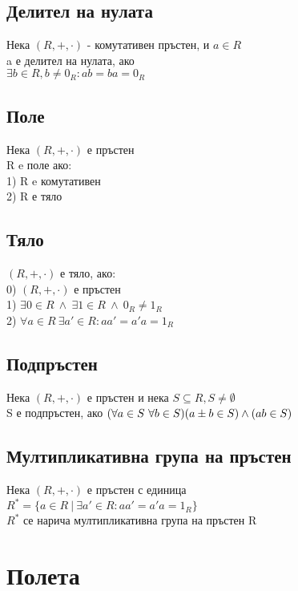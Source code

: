 \documentclass[12pt]{article}
\begin{document}
\subsection{Делител на нулата}
Нека $(R, +, \cdot)$ - комутативен пръстен, и $a \in R$\\
a е делител на нулата, ако \\
$\exists b \in R, b \neq 0_R : ab = ba = 0_R$

\subsection{Поле}
Нека $(R, +, \cdot)$ е пръстен \\
R e поле ако: \\
1) R e комутативен \\
2) R е тяло 

\subsection{Тяло}
$(R, +, \cdot)$ е тяло, ако: \\
0) $(R, +, \cdot)$ е пръстен \\
1) $\exists 0 \in R \ \land \ \exists 1 \in R \ \land \ 0_R \neq 1_R$ \\
2) $\forall a \in R \ \exists a' \in R : aa' = a'a = 1_R$

\subsection{Подпръстен}
Нека $(R, +, \cdot)$ е пръстен
и нека $S \subseteq R, S \neq \emptyset$ \\
S е подпръстен, ако
$(\forall a \in S \ \forall b \in S) \\ (a \pm b \in S) \land (ab \in S)$

\subsection{Мултипликативна група на пръстен}
Нека $(R, +, \cdot)$ е пръстен с единица \\
$R^* = \{a \in R \ \vert \ \exists a' \in R : aa' = a'a = 1_R \}$ \\
$R^*$ се нарича мултипликативна група на пръстен R

\clearpage

\section{Полета}
\end{document}
